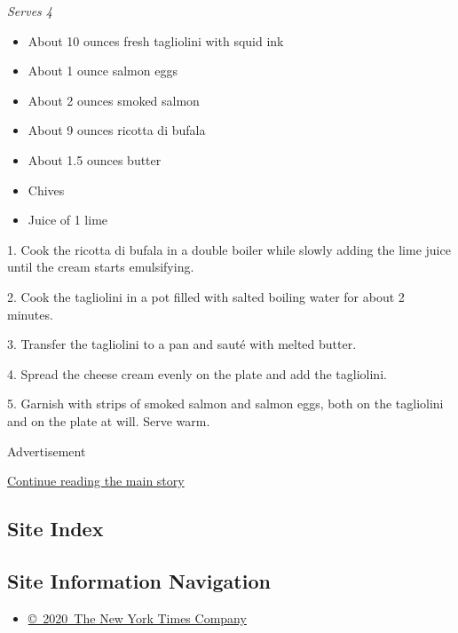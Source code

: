 \emph{Serves 4}

\begin{itemize}
\item
  About 10 ounces fresh tagliolini with squid ink
\item
  About 1 ounce salmon eggs
\item
  About 2 ounces smoked salmon
\item
  About 9 ounces ricotta di bufala
\item
  About 1.5 ounces butter
\item
  Chives
\item
  Juice of 1 lime
\end{itemize}

1. Cook the ricotta di bufala in a double boiler while slowly adding the
lime juice until the cream starts emulsifying.

2. Cook the tagliolini in a pot filled with salted boiling water for
about 2 minutes.

3. Transfer the tagliolini to a pan and sauté with melted butter.

4. Spread the cheese cream evenly on the plate and add the tagliolini.

5. Garnish with strips of smoked salmon and salmon eggs, both on the
tagliolini and on the plate at will. Serve warm.

Advertisement

\protect\hyperlink{after-bottom}{Continue reading the main story}

\hypertarget{site-index}{%
\subsection{Site Index}\label{site-index}}

\hypertarget{site-information-navigation}{%
\subsection{Site Information
Navigation}\label{site-information-navigation}}

\begin{itemize}
\tightlist
\item
  \href{https://help.nytimes3xbfgragh.onion/hc/en-us/articles/115014792127-Copyright-notice}{©~2020~The
  New York Times Company}
\end{itemize}

